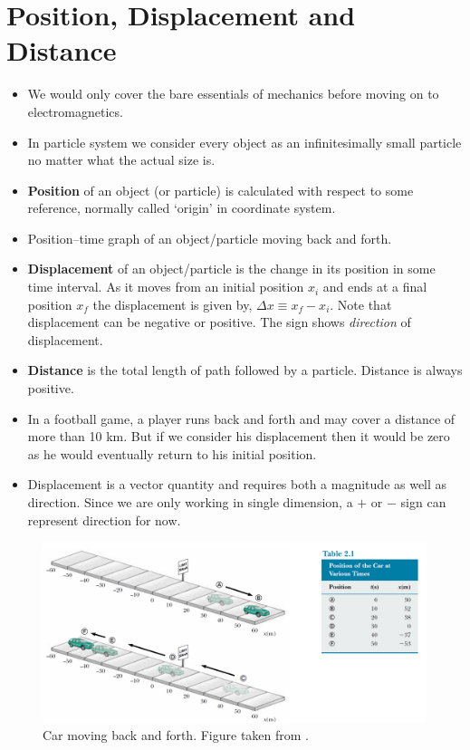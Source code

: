 \documentclass[12pt,a4paper]{article}
\begin{document}
\section{Position, Displacement and Distance}
\begin{itemize}
\item We would only cover the bare essentials of mechanics before moving on to electromagnetics.
\item In particle system we consider every object as an infinitesimally small particle no matter what the actual size is.
\item \textbf{Position} of an object (or particle) is calculated with respect to some reference, normally called `origin' in coordinate system.
\item Position--time graph of an object/particle moving back and forth.
\item \textbf{Displacement} of an object/particle is the change in its position in some time interval. As it moves from an initial position $x_i$ and ends at a final position $x_f$ the displacement is given by, $\Delta x \equiv x_f - x_i$. Note that displacement can be negative or positive. The sign shows \textit{direction} of displacement.
\item \textbf{Distance} is the total length of path followed by a particle. Distance is always positive.
\item In a football game, a player runs back and forth and may cover a distance of more than 10 km. But if we consider his displacement then it would be zero as he would eventually return to his initial position.
\item Displacement is a vector quantity and requires both a magnitude as well as direction. Since we are only working in single dimension, a $+$ or $-$ sign can represent direction for now.
\end{itemize}
\begin{figure}[H]
\centering
\includegraphics[scale=0.25]{Figure2-1a.png}
\caption{Car moving back and forth. Figure taken from \cite[ch. 2]{Serway}.}
\label{Car-moving-back-and-forth}
\end{figure}
\end{document}
